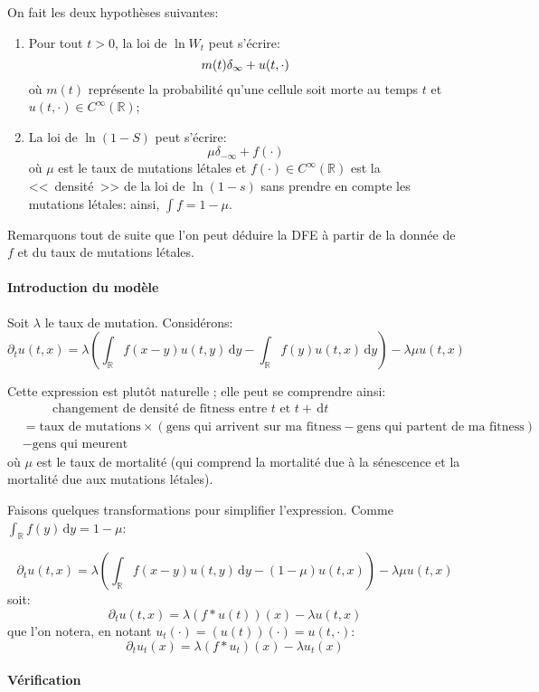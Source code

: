 \documentclass[12pt]{article}
\newcommand{\pth}[1]{\left(#1\right)}
\newcommand{\esp}{\hspace{1cm}}
\newcommand{\de}{\,\mathrm{d}}
\newcommand{\Er}{\mathbb{R}}
\newcommand{\dr}{\partial}
\begin{document}
On fait les deux hypothèses suivantes:
\begin{enumerate}
\item Pour tout $t>0$, la loi de $\ln W_t$ peut s'écrire:
  \[m(t)\delta_{\-\infty}+u(t,\cdot)\]
  où $m(t)$ représente la probabilité qu'une cellule soit morte au temps $t$ et $u(t,\cdot)\in C^{\infty}(\Er)$;
\item La loi de $\ln (1-S)$ peut s'écrire:
  \[\mu\delta_{-\infty}+f(\cdot)\]
  où $\mu$ est le taux de mutations létales et $f(\cdot)
  \in C^{\infty}(\Er)$ est la <<~densité~>> de la loi de $\ln(1-s)$ sans prendre en compte les mutations létales: ainsi, $\int f=1-\mu$.
\end{enumerate}

Remarquons tout de suite que l'on peut déduire la DFE à partir de la donnée de $f$ et du taux de mutations létales.

\paragraph{Introduction du modèle}

Soit $\lambda$ le taux de mutation. Considérons:
\[\dr_tu(t,x)=\lambda\pth{\int_{\Er}f(x-y)u(t,y)\de y-\int_{\Er}f(y)u(t,x)\de y}-\lambda\mu u(t,x)\]

Cette expression est plutôt naturelle ; elle peut se comprendre ainsi:
\begin{align*}
&\esp\text{changement de densité de fitness entre $t$ et $t+\de t$}\\
&=\text{taux de mutations}\times\pth{\text{gens qui arrivent sur ma fitness}-\text{gens qui partent de ma fitness}}\\
&-\text{gens qui meurent}
\end{align*} 
où $\mu$ est le taux de mortalité (qui comprend la mortalité due à la sénescence et la mortalité due aux mutations létales). 

Faisons quelques transformations pour simplifier l'expression. Comme $\int_{\Er}f(y)\de y = 1-\mu$:

\[\dr_tu(t,x)=\lambda\pth{\int_{\Er}f(x-y)u(t,y)\de y-(1-\mu)u(t,x)}-\lambda\mu u(t,x)\] 
soit:
\[\dr_tu(t,x)=\lambda (f*u(t))(x)-\lambda u(t,x)\] 
que l'on notera, en notant $u_t(\cdot)=(u(t))(\cdot)=u(t,\cdot)$:
\begin{equation}\label{edp}
  \dr_tu_t(x)=\lambda (f*u_t)(x)-\lambda u_t(x)
\end{equation}

\paragraph{Vérification}
\end{document}
